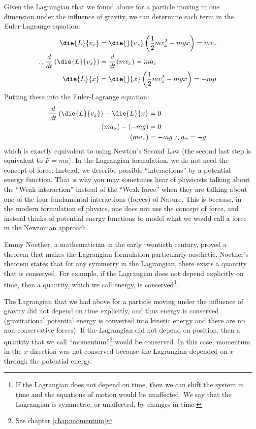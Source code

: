 Given the Lagrangian that we found above for a particle moving in one dimension under the influence of gravity, we can determine each term in the Euler-Lagrange equation:
\begin{align*}
\die{L}{v_x} &= \die{}{v_x}\left(\frac{1}{2}mv_x^2 - mgx \right)=mv_x\\
\therefore\frac{d}{dt}\left(\die{L}{v_x}\right) &= \frac{d}{dt} (mv_x) = ma_x\\
\die{L}{x}&= \die{}{x}\left(\frac{1}{2}mv_x^2 - mgx\right) = -mg\\
\end{align*}
Putting these into the Euler-Lagrange equation:
\begin{align*}
\frac{d}{dt}\left(\die{L}{v_x}\right)-\die{L}{x} &= 0\\
(ma_x) - (-mg) &=0\\
(ma_x)&=-mg
\therefore a_x = -g
\end{align*}
which is exactly equivalent to using Newton's Second Law (the second last step is equivalent to $F=ma$). In the Lagrangian formulation, we do not need the concept of force. Instead, we describe possible ``interactions'' by a potential energy function. That is why you may sometimes hear of physicists talking about the ``Weak interaction'' instead of the ``Weak force'' when they are talking about one of the four fundamental interactions (forces) of Nature. This is because, in the modern formulation of physics, one does not use the concept of force, and instead thinks of potential energy functions to model what we would call a force in the Newtonian approach.

Emmy Noether, a mathematician in the early twentieth century, proved a theorem that makes the Lagrangian formulation particularly aesthetic.
 Noether's theorem states that for any symmetry in the Lagrangian, there exists a quantity that is conserved. For example, if the Lagrangian does not depend explicitly on time, then a quantity, which we call energy, is conserved\footnote{If the Lagrangian does not depend on time, then we can shift the system in time and the equations of motion would be unaffected. We say that the Lagrangian is symmetric, or unaffected, by changes in time.}. 

The Lagrangian that we had above for a particle moving under the influence of gravity did not depend on time explicitly, and thus energy is conserved (gravitational potential energy is converted into kinetic energy and there are no non-conservative forces). If the Lagrangian did not depend on position, then a quantity that we call ``momentum''\footnote{See chapter \ref{chap:momentum}} would be conserved. In this case, momentum in the $x$ direction was not conserved because the Lagrangian depended on $x$ through the potential energy. 

